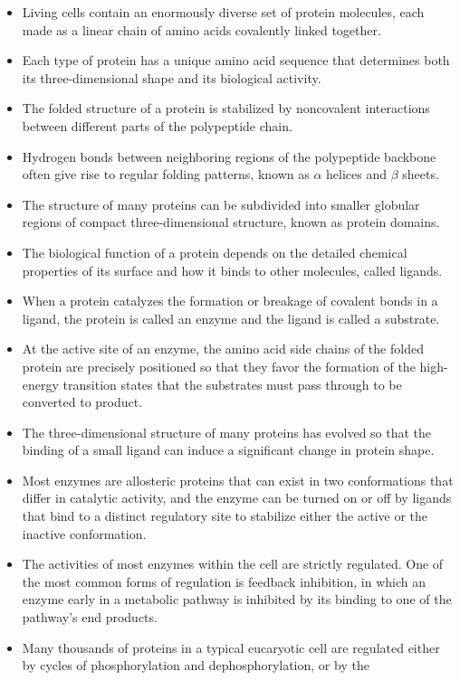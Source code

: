\begin{itemize}
\item Living cells contain an enormously diverse set of protein molecules,
each made as a linear chain of amino acids covalently linked
together.
\item Each type of protein has a unique amino acid sequence that determines 
both its three-dimensional shape and its biological activity.
\item The folded structure of a protein is stabilized by noncovalent interactions 
between different parts of the polypeptide chain.
\item Hydrogen bonds between neighboring regions of the polypeptide
backbone often give rise to regular folding patterns, known as $\alpha$ helices and $\beta$ sheets.
\item The structure of many proteins can be subdivided into smaller globular 
regions of compact three-dimensional structure, known as protein
domains.
\item The biological function of a protein depends on the detailed chemical
properties of its surface and how it binds to other molecules, called
ligands.
\item When a protein catalyzes the formation or breakage of covalent
bonds in a ligand, the protein is called an enzyme and the ligand is
called a substrate.
\item At the active site of an enzyme, the amino acid side chains of the
folded protein are precisely positioned so that they favor the formation 
of the high-energy transition states that the substrates must
pass through to be converted to product.
\item The three-dimensional structure of many proteins has evolved so
that the binding of a small ligand can induce a significant change in
protein shape.
\item Most enzymes are allosteric proteins that can exist in two conformations 
that differ in catalytic activity, and the enzyme can be turned
on or off by ligands that bind to a distinct regulatory site to stabilize
either the active or the inactive conformation.
\item The activities of most enzymes within the cell are strictly regulated.
One of the most common forms of regulation is feedback inhibition,
in which an enzyme early in a metabolic pathway is inhibited by its
binding to one of the pathway’s end products.
\item Many thousands of proteins in a typical eucaryotic cell are regulated
either by cycles of phosphorylation and dephosphorylation, or by the

\end{itemize}
